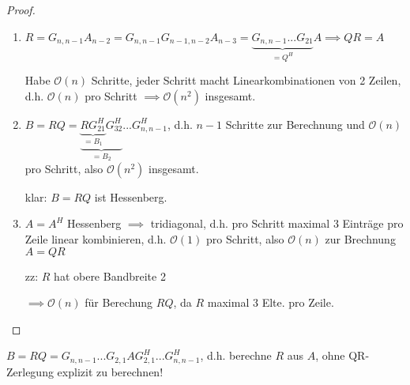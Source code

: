 \begin{proof}
	\begin{enumerate}
		\item $R = G_{n, n-1} A_{n-2} = G_{n,n-1}G_{n-1, n-2} A_{n-3} = \underbrace{G_{n,n-1} ... G_{21}}_{=Q^H}A \implies QR=A$
		
		Habe $\mathcal{O}(n)$ Schritte, jeder Schritt macht Linearkombinationen von 2 Zeilen, d.h. $\mathcal{O}(n)$ pro Schritt $\implies \mathcal{O}(n^2)$ insgesamt.
		
		\item $B = RQ = \underbrace{\underbrace{RG_{21}^H}_{=B_1}G_{32}^H}_{=B_2} ... G_{n,n-1}^H$, d.h. $n-1$ Schritte zur Berechnung und $\mathcal{O}(n)$ pro Schritt, also $\mathcal{O}(n^2)$ insgesamt.
		
		klar: $B = RQ$ ist Hessenberg.
		
		\item $A=A^H$ Hessenberg $\implies$ tridiagonal, d.h. pro Schritt maximal 3 Einträge pro Zeile linear kombinieren, d.h. $\mathcal{O}(1)$ pro Schritt, also $\mathcal{O}(n)$ zur Brechnung $A=QR$
		
		zz: $R$ hat obere Bandbreite 2
		
		$\implies \mathcal{O}(n)$ für Berechung $RQ$, da $R$ maximal 3 Elte. pro Zeile.
	\end{enumerate}
\end{proof}

\begin{remark}
	$B=RQ = G_{n,n-1} ... G_{2,1}A G_{2,1}^H ... G_{n,n-1}^H$, d.h. berechne $R$ aus $A$, ohne QR-Zerlegung explizit zu berechnen!
\end{remark}
